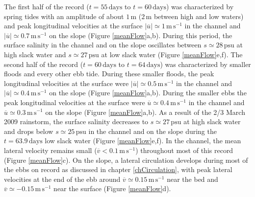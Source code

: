 The first half of the record ($t=55\, \mathrm{days}$ to $t=60\, \mathrm{days}$) was characterized by spring tides with an amplitude of about $1 \, \mathrm{m}$ ($2 \, \mathrm{m}$ between high and low waters) and peak longitudinal velocities at the surface $\left| \overline{u} \right| \simeq 1 \, \mathrm{m}\,\mathrm{s}^{-1}$ in the channel and $\left| \overline{u} \right| \simeq 0.7 \, \mathrm{m}\,\mathrm{s}^{-1}$ on the slope (Figure \ref{meanFlow}a,b). During this period, the surface salinity in the channel and on the slope oscillates between $s \simeq 28 \, \mathrm{psu}$ at high slack water and $s \simeq 27 \, \mathrm{psu}$ at low slack water (Figure \ref{meanFlow}e,f). The second half of the record ($t=60\, \mathrm{days}$ to $t=64\, \mathrm{days}$) was characterized by smaller floods and every other ebb tide. During these smaller floods, the peak longitudinal velocities at the surface were $\left| \overline{u} \right| \simeq 0.5 \, \mathrm{m}\,\mathrm{s}^{-1}$ in the channel and  $\left| \overline{u} \right| \simeq 0.4 \, \mathrm{m}\,\mathrm{s}^{-1}$ on the slope (Figure \ref{meanFlow}a,b). During the smaller ebbs the peak longitudinal velocities at the surface were $\overline{u} \simeq 0.4 \, \mathrm{m}\,\mathrm{s}^{-1}$ in the channel and  $\overline{u} \simeq 0.3 \, \mathrm{m}\,\mathrm{s}^{-1}$ on the slope (Figure \ref{meanFlow}a,b). As a result of the 2/3 March 2009 rainstorm, the surface salinity decreases to $s \simeq 27 \, \mathrm{psu}$ at high slack water and drops below $s \simeq 25 \, \mathrm{psu}$ in the channel and on the slope during the $t=63.9\,\mathrm{days}$ low slack water (Figure \ref{meanFlow}e,f). In the channel, the mean lateral velocity remains small ($\overline{v} < 0.1 \, \mathrm{m}\,\mathrm{s}^{-1}$) throughout most of this record (Figure \ref{meanFlow}c). On the slope, a lateral circulation develops during most of the ebbs on record as discussed in chapter \ref{chCirculation}, with peak lateral velocities at the end of the ebb around $\overline{v} \simeq 0.15 \, \mathrm{m}\,\mathrm{s}^{-1}$ near the bed and $\overline{v} \simeq -0.15 \, \mathrm{m}\,\mathrm{s}^{-1}$ near the surface (Figure \ref{meanFlow}d).

